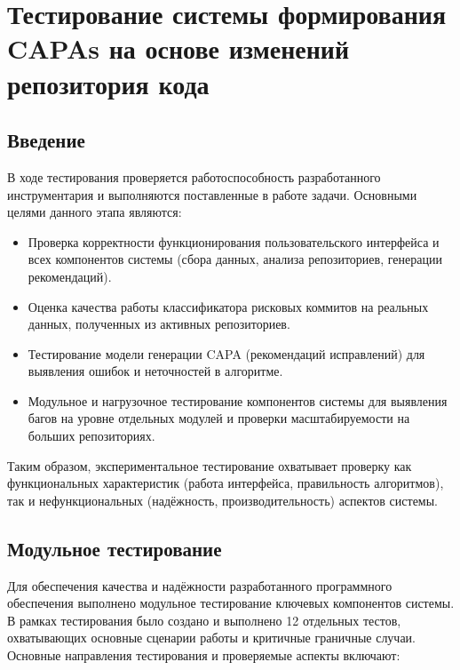 \chapter{Тестирование системы формирования CAPAs на основе изменений репозитория кода} \section{Введение}
В ходе тестирования проверяется работоспособность разработанного инструментария и выполняются поставленные в работе задачи. Основными целями данного этапа являются:
\begin{itemize}
	\item Проверка корректности функционирования пользовательского интерфейса и всех компонентов системы (сбора данных, анализа репозиториев, генерации рекомендаций).
	\item Оценка качества работы классификатора рисковых коммитов на реальных данных, полученных из активных репозиториев.
	\item Тестирование модели генерации CAPA (рекомендаций исправлений) для выявления ошибок и неточностей в алгоритме.
	\item Модульное и нагрузочное тестирование компонентов системы для выявления багов на уровне отдельных модулей и проверки масштабируемости на больших репозиториях.
\end{itemize}
Таким образом, экспериментальное тестирование охватывает проверку как функциональных характеристик (работа интерфейса, правильность алгоритмов), так и нефункциональных (надёжность, производительность) аспектов системы.

\section{Модульное тестирование}

Для обеспечения качества и надёжности разработанного программного обеспечения выполнено модульное тестирование ключевых компонентов системы. В рамках тестирования было создано и выполнено 12 отдельных тестов, охватывающих основные сценарии работы и критичные граничные случаи. Основные направления тестирования и проверяемые аспекты включают:


